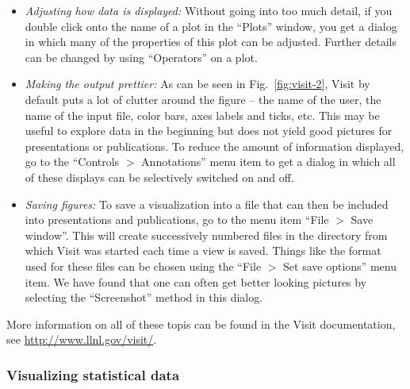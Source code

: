 \documentclass{article}
\begin{document}
\begin{itemize}
\item \textit{Adjusting how data is displayed:} Without going into too much
  detail, if you double click onto the name of a plot in the ``Plots'' window,
  you get a dialog in which many of the properties of this plot can be
  adjusted. Further details can be changed by using ``Operators'' on a plot.

\item \textit{Making the output prettier:} As can be seen in
  Fig.~\ref{fig:visit-2}, Visit by default puts a lot of clutter around the
  figure -- the name of the user, the name of the input file, color bars, axes
  labels and ticks, etc. This may be useful to explore data in the beginning
  but does not yield good pictures for presentations or publications. To
  reduce the amount of information displayed, go to the ``Controls $>$
  Annotations'' menu item to get a dialog in which all of these displays can
  be selectively switched on and off.

\item \textit{Saving figures:} To save a visualization into a file that can
  then be included into presentations and publications, go to the menu item
  ``File $>$ Save window''. This will create successively numbered files in
  the directory from which Visit was started each time a view is saved. Things
  like the format used for these files can be chosen using the ``File $>$ Set
  save options'' menu item. We have found that one can often get better
  looking pictures by selecting the ``Screenshot'' method in this dialog.
\end{itemize}

More information on all of these topis can be found in the Visit
documentation, see \url{http://www.llnl.gov/visit/}.


\subsubsection{Visualizing statistical data}
\label{sec:viz-stat}
\end{document}
